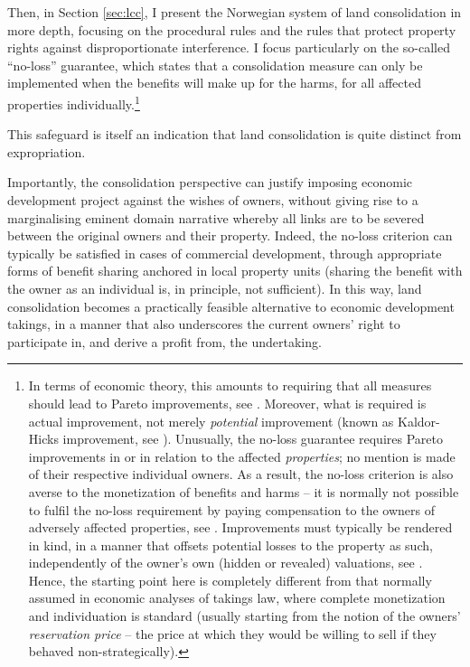{Then, in Section \ref{sec:lcc}, I present the Norwegian system of land consolidation in more depth, focusing on the procedural rules and the rules that protect property rights against disproportionate interference. I focus particularly on the so-called ``no-loss'' guarantee, which states that a consolidation measure can only be implemented when the benefits will make up for the harms, for all affected properties individually.\footnote{In terms of economic theory, this amounts to requiring that all measures should lead to Pareto improvements, see \cite[59-61]{miceli11}. Moreover, what is required is actual improvement, not merely {\it potential} improvement (known as Kaldor-Hicks improvement, see \cite[61-63]{miceli11}). Unusually, the no-loss guarantee requires Pareto improvements in or in relation to the affected {\it properties}; no mention is made of their respective individual owners. As a result, the no-loss criterion is also averse to the monetization of benefits and harms -- it is normally not possible to fulfil the no-loss requirement by paying compensation to the owners of adversely affected properties, see \cite[394]{sky09}. Improvements must typically be rendered in kind, in a manner that offsets potential losses to the property as such, independently of the owner's own (hidden or revealed) valuations, see \cite[371-372]{sky09}. Hence, the starting point here is completely different from that normally assumed in economic analyses of takings law, where complete monetization and individuation is standard (usually starting from the notion of the owners' {\it reservation price} -- the price at which they would be willing to sell if they behaved non-strategically).}

This safeguard is itself an indication that land consolidation is quite distinct from expropriation. 

Importantly, the consolidation perspective can justify imposing economic development project against the wishes of owners, without giving rise to a marginalising eminent domain narrative whereby all links are to be severed between the original owners and their property. Indeed, the no-loss criterion can typically be satisfied in cases of commercial development, through appropriate forms of benefit sharing anchored in local property units (sharing the benefit with the owner as an individual is, in principle, not sufficient). In this way, land consolidation becomes a practically feasible alternative to economic development takings, in a manner that also underscores the current owners' right to participate in, and derive a profit from, the undertaking.

}
